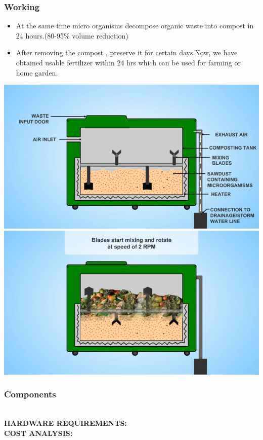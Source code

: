 \documentclass[11pt]{beamer}
\begin{document}
\begin{frame}
	\frametitle{Working}
	\begin{itemize}	
	\item At the same time micro organisms decompose organic waste into compost in 24 hours.(80-95\% volume reduction) \item After removing  the compost , preserve it for certain days.Now, we have obtained usable fertilizer within 24 hrs which can be used for farming or home garden.  
	\end{itemize}
 \includegraphics[height=0.35\textheight]{img.png}
 \hfill
 \includegraphics[height=0.35\textheight]{img1.png}
\end{frame}
\begin{frame}
	\frametitle{Components}
	\\ \textbf{HARDWARE REQUIREMENTS:}
	\\ \textbf{COST ANALYSIS:}
\end{frame}
\end{document}
